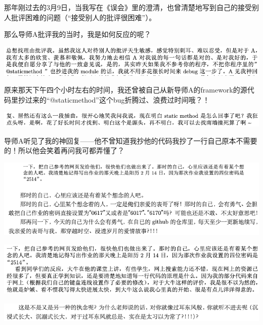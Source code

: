 \documentclass[9pt, b5paper]{article}
\begin{document}
那年刚过去的3月9日，当我写在《误会》里的澄清，也曾清楚地写到自己的接受别人批评困难的问题（“接受别人的批评很困难”）。 

那么导师A批评我的当时，我是如何反应的呢？

\begin{center}
\includegraphics[width=.9\linewidth]{./pic/backups_plans_20210512_103506.png}
\end{center}

原来那天下午四个小时左右的时间，我还曾被自己从新导师A的framework的源代码里抄过来的“@staticmethod”这个bug折腾过、浪费过时间哦？！

\begin{center}
\includegraphics[width=.9\linewidth]{./pic/backups_plans_20210512_103758.png}
\end{center}

导师A听见了我的神回复——他不曾知道我抄他的代码我抄了一行自己原本不需要的！所以他会笑着再问我可都弄懂了？

\begin{center}
\includegraphics[width=.9\linewidth]{./pic/backups_plans_20210512_104131.png}
\end{center}


\begin{center}
\includegraphics[width=.9\linewidth]{./pic/backups_plans_20210512_104021.png}
\end{center}

\begin{center}
\includegraphics[width=.9\linewidth]{./pic/backups_plans_20210512_104149.png}
\end{center}
\end{document}
